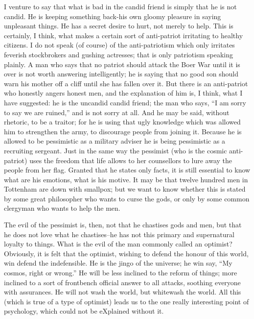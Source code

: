 \documentclass{book}
\begin{document}
I venture to say that what is bad in the candid friend is simply that he is not candid. He is keeping something back-his own gloomy pleasure in saying unpleasant things. He has a secret desire to hurt, not merely to help. This is certainly, I think, what makes a certain sort of anti-patriot irritating to healthy citizens. I do not speak (of course) of the anti-patriotism which only irritates feverish stockbrokers and gushing actresses; that is only patriotism speaking plainly. A man who says that no patriot should attack the Boer War until it is over is not worth answering intelligently; he is saying that no good son should warn his mother off a cliff until she has fallen over it. But there is an anti-patriot who honestly angers honest men, and the explanation of him is, I think, what I have suggested: he is the uncandid candid friend; the man who says, “I am sorry to say we are ruined,” and is not sorry at all. And he may be said, without rhetoric, to be a traitor; for he is using that ugly knowledge which was allowed him to strengthen the army, to discourage people from joining it. Because he is allowed to be pessimistic as a military adviser he is being pessimistic as a recruiting sergeant. Just in the same way the pessimist (who is the cosmic anti-patriot) uses the freedom that life allows to her counsellors to lure away the people from her flag. Granted that he states only facts, it is still essential to know what are his emotions, what is his motive. It may be that twelve hundred men in Tottenham are down with smallpox; but we want to know whether this is stated by some great philosopher who wants to curse the gods, or only by some common clergyman who wants to help the men.

The evil of the pessimist is, then, not that he chastises gods and men, but that he does not love what he chastises–he has not this primary and supernatural loyalty to things. What is the evil of the man commonly called an optimist? Obviously, it is felt that the optimist, wishing to defend the honour of this world, win defend the indefensible. He is the jingo of the universe; he win say, “My cosmos, right or wrong.” He will be less inclined to the reform of things; more inclined to a sort of frontbench official answer to all attacks, soothing everyone with assurances. He will not wash the world, but whitewash the world. All this (which is true of a type of optimist) leads us to the one really interesting point of psychology, which could not be eXplained without it.
\end{document}
